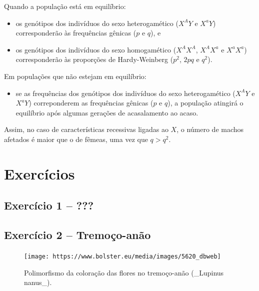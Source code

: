 \documentclass[
]{book}
\providecommand{\tightlist}{%
  \setlength{\itemsep}{0pt}\setlength{\parskip}{0pt}}
\begin{document}
Quando a população está em equilíbrio:

\begin{itemize}
\item
  os genótipos dos indivíduos do sexo heterogamético (\(X^AY\) e \(X^aY\)) corresponderão às frequências gênicas (\(p\) e \(q\)), e
\item
  os genótipos dos indivíduos do sexo homogamético (\(X^AX^A\), \(X^AX^a\) e \(X^aX^a\)) corresponderão às proporções de Hardy-Weinberg (\(p^2\), \(2pq\) e \(q^2\)).
\end{itemize}

Em populações que não estejam em equilíbrio:

\begin{itemize}
\tightlist
\item
  se as frequências dos genótipos dos indivíduos do sexo heterogamético (\(X^AY\) e \(X^aY\)) correponderem as frequências gênicas (\(p\) e \(q\)), a população atingirá o equilíbrio após algumas gerações de acasalamento ao acaso.
\end{itemize}

Assim, no caso de características recessivas ligadas ao \(X\), o número de machos afetados é maior que o de fêmeas, uma vez que \(q > q^2\).

\hypertarget{exercuxedcios}{%
\section{Exercícios}\label{exercuxedcios}}

\hypertarget{exercuxedcio-1}{%
\subsection{Exercício 1 -- ???}\label{exercuxedcio-1}}

\hypertarget{exercuxedcio-2-tremouxe7o-anuxe3o}{%
\subsection{Exercício 2 -- Tremoço-anão}\label{exercuxedcio-2-tremouxe7o-anuxe3o}}

\begin{figure}

{\centering \texttt{[image: https://www.bolster.eu/media/images/5620\_dbweb]} 

}

\caption{Polimorfismo da coloração das flores no tremoço-anão (_Lupinus nanus_).}\label{fig:lnanus}
\end{figure}
\end{document}
